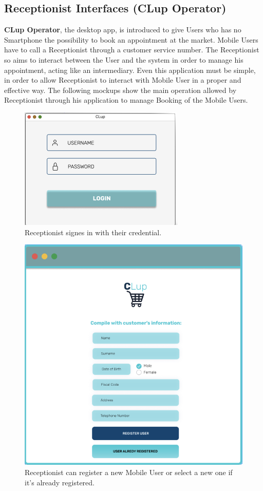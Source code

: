 \subsection{Receptionist Interfaces (CLup Operator)}
\textbf{CLup Operator}, the desktop app, is introduced to give Users who has no Smartphone the possibility to book an appointment at the market. Mobile Users have to call a Receptionist through a customer service number. The Receptionist so aims to interact between the User and the system in order to manage his appointment, acting like an intermediary. 
Even this application must be simple, in order to allow Receptionist to interact with Mobile User in a proper and effective way.
The following mockups show the main operation allowed by Receptionist through his application to manage Booking of the Mobile Users.
\begin{figure}[H]
  \caption{Receptionist signes in with their credential.}
  \label{fig:Login}
  \centering
  \includegraphics[scale=0.55]{images/mockup/LOGIN_REC.png}

\end{figure}

\begin{figure}[H]
  \caption{Receptionist can register a new Mobile User or select a new one if it's already registered.}
  \label{fig:Login}
  \centering
  \includegraphics[scale=0.32]{images/mockup/LOGREG.png}

\end{figure}

